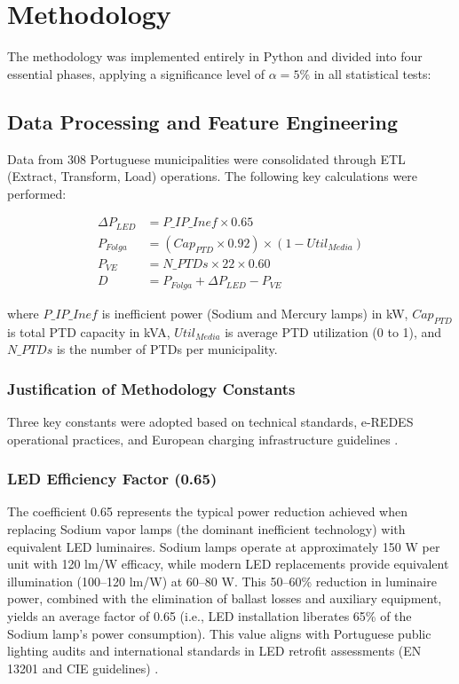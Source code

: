 \documentclass[conference]{IEEEtran}
\begin{document}
\section{Methodology}

The methodology was implemented entirely in Python and divided into four essential phases, applying a significance level of $\alpha = 5\%$ in all statistical tests:

\subsection{Data Processing and Feature Engineering}

Data from 308 Portuguese municipalities were consolidated through ETL (Extract, Transform, Load) operations. The following key calculations were performed:

\begin{align}
\Delta P_{LED} &= P\_IP\_Inef \times 0.65 \label{eq:led_gain}\\
P_{Folga} &= (Cap_{PTD} \times 0.92) \times (1 - Util_{Media}) \label{eq:slack}\\
P_{VE} &= N\_PTDs \times 22 \times 0.60 \label{eq:ve_demand}\\
D &= P_{Folga} + \Delta P_{LED} - P_{VE} \label{eq:delta}
\end{align}

where $P\_IP\_Inef$ is inefficient power (Sodium and Mercury lamps) in kW, $Cap_{PTD}$ is total PTD capacity in kVA, $Util_{Media}$ is average PTD utilization (0 to 1), and $N\_PTDs$ is the number of PTDs per municipality.

\subsubsection{Justification of Methodology Constants}

Three key constants were adopted based on technical standards, e-REDES operational practices, and European charging infrastructure guidelines \cite{Gouveia2015}.

\subsubsection{LED Efficiency Factor (0.65)}

The coefficient 0.65 represents the typical power reduction achieved when replacing Sodium vapor lamps (the dominant inefficient technology) with equivalent LED luminaires. Sodium lamps operate at approximately 150 W per unit with 120 lm/W efficacy, while modern LED replacements provide equivalent illumination (100--120 lm/W) at 60--80 W. This 50--60\% reduction in luminaire power, combined with the elimination of ballast losses and auxiliary equipment, yields an average factor of 0.65 (i.e., LED installation liberates 65\% of the Sodium lamp's power consumption). This value aligns with Portuguese public lighting audits and international standards in LED retrofit assessments (EN 13201 and CIE guidelines) \cite{Rossi2016}.
\end{document}
